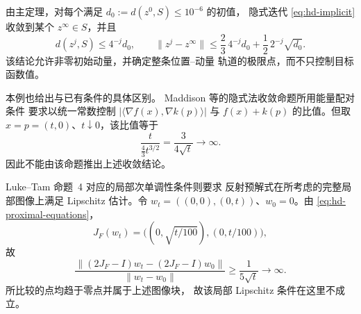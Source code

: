 由主定理，对每个满足
$d_0:=d(z^0,S)\leq10^{-6}$ 的初值，
隐式迭代 \eqref{eq:hd-implicit} 收敛到某个
$z^\infty\in S$，并且
\[
 d(z^j,S)\leq4^{-j}d_0,\qquad
 \|z^j-z^\infty\|
 \leq\frac23\,4^{-j}d_0
      +\frac12\,2^{-j}\sqrt{d_0}.
\]
该结论允许非零初始动量，并确定整条位置--动量
轨道的极限点，而不只控制目标函数值。

本例也给出与已有条件的具体区别。
Maddison 等的隐式法收敛命题所用能量配对条件
要求以统一常数控制
$|\langle\nabla f(x),\nabla k(p)\rangle|$
与 $f(x)+k(p)$ 的比值。但取
$x=p=(t,0)$、$t\downarrow0$，该比值等于
\[
 \frac{t}{\frac43t^{3/2}}
 =\frac{3}{4\sqrt t}\longrightarrow\infty.
\]
因此不能由该命题推出上述收敛结论。

Luke--Tam 命题~4 对应的局部次单调性条件则要求
反射预解式在所考虑的完整局部图像上满足
Lipschitz 估计。令
$w_t=((0,0),(0,t))$、$w_0=0$。由
\eqref{eq:hd-proximal-equations}，
\[
 J_F(w_t)
 =\bigl((0,\sqrt{t/100}),(0,t/100)\bigr),
\]
故
\[
 \frac{\|(2J_F-I)w_t-(2J_F-I)w_0\|}
      {\|w_t-w_0\|}
 \geq\frac1{5\sqrt t}\longrightarrow\infty.
\]
所比较的点均趋于零点并属于上述图像块，
故该局部 Lipschitz 条件在这里不成立。
